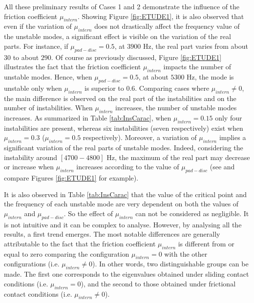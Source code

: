 \documentclass[final,1p]{elsarticle}
\begin{document}
All these preliminary results of Cases 1 and 2 demonstrate the influence of the friction coefficient $\mu_{intern}$. Showing Figure \ref{fig:ETUDE1}, it is also observed that even if the variation of $\mu_{intern}$ does not drastically affect the frequency value of the unstable modes, a significant effect is visible on the variation of the real parts. For instance, if $\mu_{pad-disc} = 0.5$, at $3900$ Hz, the real part varies from about $30$ to about $290$. Of course as previously discussed, Figure \ref{fig:ETUDE1} illustrates the fact that the friction coefficient $\mu_{intern}$ impacts the number of unstable modes. Hence, when $\mu_{pad-disc} = 0.5$, at about $5300$ Hz, the mode is unstable only when $\mu_{intern}$ is superior to $0.6$. 
Comparing cases where  $\mu_{intern} \neq 0$, the main difference is observed on the real part of the instabilities and on the number of instabilities. When $\mu_{intern}$ increases, the number of unstable modes increases. As summarized in Table \ref{tab:InsCarac}, when $\mu_{intern}=0.15$ only four instabilities are present, whereas six instabilities (seven respectively) exist when $\mu_{intern}=0.3$ ($\mu_{intern}=0.5$ respectively). Moreover, a variation of $\mu_{intern}$ implies a significant variation of the real parts of unstable modes. Indeed, considering the instability around $[4700-4800]$ Hz, the maximum of the real part may decrease or increase when $\mu_{intern}$ increases according to the value of $\mu_{pad-disc}$ (see and compare Figures \ref{fig:ETUDE1} for example). 

It is also observed in Table \ref{tab:InsCarac} that the value of the critical point and the frequency of each unstable mode are very dependent on both the values of $\mu_{intern}$ and $\mu_{pad-disc}$. So the effect of $\mu_{intern}$ can not be considered as negligible. It is not intuitive and it can be complex to analyse. However, by analysing all the results, a first trend emerges. The most notable differences are generally attributable to the fact that the friction coefficient $\mu_{intern}$ is different from or equal to zero comparing the configuration $\mu_{intern} =0$ with the other configurations (i.e. $\mu_{intern} \neq 0$). In other words, two distinguishable groups can be made. The first one corresponds to the eigenvalues obtained under sliding contact conditions (i.e. $\mu_{intern} =0$), and the second to those obtained under frictional contact conditions (i.e. $\mu_{intern} \neq 0$). 
\end{document}
